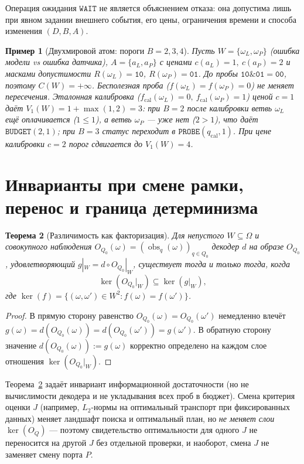 \documentclass[11pt,a4paper]{article}
\theoremstyle{preprintthm}
\newtheorem{theorem}{Теорема}[section]
\theoremstyle{preprintdef}
\newtheorem{example}[theorem]{Пример}
\newcommand{\kerrel}{\operatorname{ker}}
\newcommand{\obs}{\operatorname{obs}}
\begin{document}
Операция ожидания $\texttt{WAIT}$ не является объяснением отказа: она допустима лишь при явном задании внешнего события, его цены, ограничения времени и способа изменения $(D,B,A)$.

\begin{example}[Двухмировой атом: пороги $B=2,3,4$]
Пусть $W=\{\omega_L,\omega_P\}$ (ошибка модели vs ошибка датчика), $A=\{a_L,a_P\}$ с ценами $c(a_L)=1,\ c(a_P)=2$ и масками допустимости $R(\omega_L)=\texttt{10}$, $R(\omega_P)=\texttt{01}$. До пробы $\texttt{10}\mathbin{\&}\texttt{01}=\texttt{00}$, поэтому $C(W)=+\infty$. Бесполезная проба ($f(\omega_L)=f(\omega_P)=0$) не меняет пересечения. Эталонная калибровка ($f_{\mathrm{cal}}(\omega_L)=0,\ f_{\mathrm{cal}}(\omega_P)=1$) ценой $c=1$ даёт $V_1(W)=1+\max(1,2)=3$: при $B=2$ после калибровки ветвь $\omega_L$ ещё оплачивается ($1\le 1$), а ветвь $\omega_P$ --- уже нет ($2>1$), что даёт $\texttt{BUDGET}(2,1)$; при $B=3$ статус переходит в $\texttt{PROBE}(q_{\mathrm{cal}},1)$. При цене калибровки $c=2$ порог сдвигается до $V_1(W)=4$.
\end{example}

\section{Инварианты при смене рамки, перенос и граница детерминизма}

\begin{theorem}[Различимость как факторизация]
\label{thm:factorization}
Для непустого $W\subseteq\Omega$ и совокупного наблюдения $O_{Q_0}(\omega)=(\obs_q(\omega))_{q\in Q_0}$ декодер $d$ на образе $O_{Q_0}$, удовлетворяющий $g|_W = d\circ O_{Q_0}|_W$, существует тогда и только тогда, когда
\begin{equation}
  \kerrel(O_{Q_0}|_W) \subseteq \kerrel(g|_W),
\end{equation}
где $\kerrel(f)=\{(\omega,\omega')\in W^2 : f(\omega)=f(\omega')\}$.
\end{theorem}
\begin{proof}
В прямую сторону равенство $O_{Q_0}(\omega)=O_{Q_0}(\omega')$ немедленно влечёт $g(\omega)=d(O_{Q_0}(\omega))=d(O_{Q_0}(\omega'))=g(\omega')$. В обратную сторону значение $d(O_{Q_0}(\omega)):=g(\omega)$ корректно определено на каждом слое отношения $\kerrel(O_{Q_0}|_W)$.
\end{proof}

Теорема~\ref{thm:factorization} задаёт инвариант информационной достаточности (но не вычислимости декодера и не укладывания всех проб в бюджет). Смена критерия оценки $J$ (например, $L_2$-нормы на оптимальный транспорт при фиксированных данных) меняет ландшафт поиска и оптимальный план, но \emph{не меняет слои} $\kerrel(O_Q)$ --- поэтому свидетельство оптимальности для одного $J$ не переносится на другой $J$ без отдельной проверки, и наоборот, смена $J$ не заменяет смену порта $P$.
\end{document}
